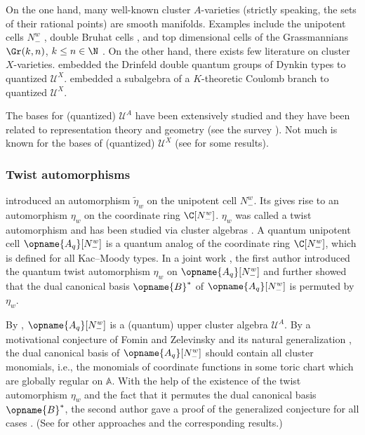\documentclass[pdftex]{sigma}
\newcommand{\dCan}{\opname{B}^*}
\newcommand{\upClAlg}{\mathcal{U}^A}
\newcommand{\XClAlg}{\mathcal{U}^X}
\newcommand{\AVar}{\mathbb{A}}
\newcommand{\qO}{{\opname{A_q}}}
\numberwithin{equation}{section}
\begin{document}
On the one hand, many well-known cluster $A$-varieties (strictly
speaking, the sets of their rational points) are smooth manifolds.
Examples include the unipotent cells $N_{-}^{w}$ \cite{GeissLeclercSchroeer10},
double Bruhat cells \cite{BerensteinFominZelevinsky05}, and top dimensional
cells of the Grassmannians $\Gr(k,n)$, $k\leq n\in\N$ \cite{scott2006grassmannians}.
On the other hand, there exists few literature on cluster $X$-varieties.
\cite{ip2018cluster,schrader2019cluster,shen2022cluster} embedded the Drinfeld
double quantum groups of Dynkin types to quantized $\XClAlg$. \cite{schrader2019k}
embedded a subalgebra of a $K$-theoretic Coulomb branch to quantized
$\XClAlg$.

The bases for (quantized) $\upClAlg$ have been extensively studied
and they have been related to representation theory and geometry (see
the survey \cite{qin2021cluster}). Not much is known for the bases
of (quantized) $\XClAlg$ (see \cite{allegretti2019categorified,FockGoncharov06a,gross2018canonical} for some results).

\subsubsection*{Twist automorphisms}

\cite{BerensteinFominZelevinsky96,berenstein1997total} introduced
an automorphism $\tilde{\eta}_{w}$ on the unipotent cell $N_{-}^{w}$.
Its gives rise to an automorphism $\eta_{w}$ on the coordinate ring
$\C[N_{-}^{w}]$. $\eta_{w}$ was called a twist automorphism and
has been studied via cluster algebras \cite{GeissLeclercSchroeer10b}.
A quantum unipotent cell $\qO[N_{-}^{w}]$ is a quantum analog of
the coordinate ring $\C[N_{-}^{w}]$, which is defined for all Kac--Moody
types. In a joint work \cite{kimura2017twist}, the first author introduced
the quantum twist automorphism $\eta_{w}$ on $\qO[N_{-}^{w}]$ and
further showed that the dual canonical basis $\dCan$ of $\qO[N_{-}^{w}]$
is permuted by $\eta_{w}$.

By \cite{GeissLeclercSchroeer10,GeissLeclercSchroeer11,GY13,goodearl2020integral},
$\qO[N_{-}^{w}]$ is a (quantum) upper cluster algebra $\upClAlg$.
By a motivational conjecture of Fomin and Zelevinsky \cite{FominZelevinsky02}
and its natural generalization \cite{Kimura10}, the dual canonical
basis of $\qO[N_{-}^{w}]$ should contain all cluster monomials, i.e.,
the monomials of coordinate functions in some toric chart which are globally regular
on $\AVar$. With the help of the existence of the twist automorphism
$\eta_{w}$ and the fact that it permutes the dual canonical basis
$\dCan$, the second author gave a proof of the generalized conjecture
for all cases \cite{qin2020dual}. (See \cite{Kang2018,mcnamara2021cluster,qin2017triangular} for other approaches
and the corresponding results.)
\end{document}
